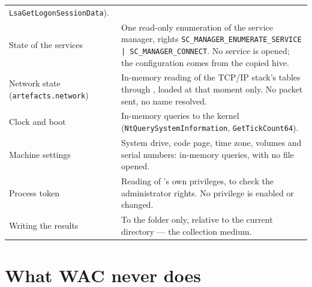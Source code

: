 \documentclass[11pt,a4paper,oneside]{report}
\begin{document}
\begin{longtable}{@{}L{4.3cm}L{10.1cm}@{}}
  \texttt{LsaGetLogonSessionData}). \\
State of the services & One read-only enumeration of the service manager,
  rights \texttt{SC\_MANAGER\_ENUMERATE\_SERVICE | SC\_MANAGER\_CONNECT}. No
  service is opened; the configuration comes from the copied hive. \\
Network state (\texttt{artefacts.network}) & In-memory reading of the TCP/IP
  stack's tables through , loaded at that moment only.
  No packet sent, no name resolved. \\
Clock and boot & In-memory queries to the kernel
  (\texttt{NtQuerySystemInformation}, \texttt{GetTickCount64}). \\
Machine settings & System drive, code page, time zone, volumes and serial
  numbers: in-memory queries, with no file opened. \\
Process token & Reading of \wac{}'s own privileges, to check the administrator
  rights. No privilege is enabled or changed. \\
Writing the results & To the  folder only, relative to the current
  directory — the collection medium. \\
\bottomrule
\end{longtable}


\section{What WAC never does}
\end{document}

